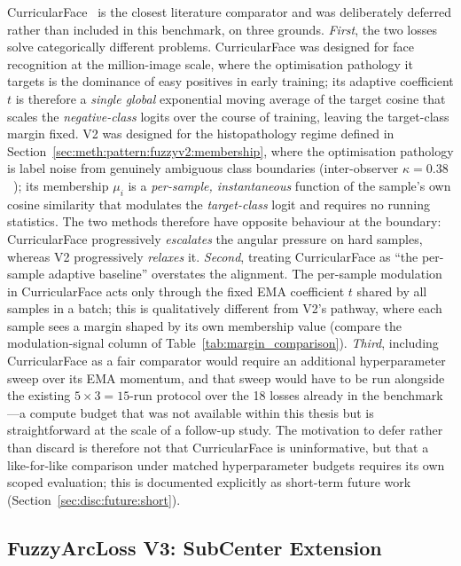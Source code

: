 CurricularFace~\cite{huang2020curricularface} is the closest
literature comparator and was deliberately deferred rather than
included in this benchmark, on three grounds.
\emph{First}, the two losses solve categorically different
problems.
CurricularFace was designed for face recognition at the
million-image scale, where the optimisation pathology it targets
is the dominance of easy positives in early training; its
adaptive coefficient $t$ is therefore a \emph{single global}
exponential moving average of the target cosine that scales the
\emph{negative-class} logits over the course of training, leaving
the target-class margin fixed.
V2 was designed for the histopathology regime defined in
Section~\ref{sec:meth:pattern:fuzzyv2:membership}, where the
optimisation pathology is label noise from genuinely ambiguous
class boundaries (inter-observer
$\kappa = 0.38$~\cite{thunnissen2012reproducibility}); its
membership $\mu_i$ is a \emph{per-sample, instantaneous} function
of the sample's own cosine similarity that modulates the
\emph{target-class} logit and requires no running statistics.
The two methods therefore have opposite behaviour at the boundary:
CurricularFace progressively \emph{escalates} the angular pressure
on hard samples, whereas V2 progressively \emph{relaxes} it.
\emph{Second}, treating CurricularFace as ``the per-sample
adaptive baseline'' overstates the alignment.
The per-sample modulation in CurricularFace acts only through the
fixed EMA coefficient $t$ shared by all samples in a batch; this
is qualitatively different from V2's pathway, where each sample
sees a margin shaped by its own membership value (compare the
modulation-signal column of Table~\ref{tab:margin_comparison}).
\emph{Third}, including CurricularFace as a fair comparator would
require an additional hyperparameter sweep over its EMA momentum,
and that sweep would have to be run alongside the existing
$5 \times 3 = 15$-run protocol over the 18 losses already in
the benchmark---a compute budget that was not available within
this thesis but is straightforward at the scale of a follow-up
study.
The motivation to defer rather than discard is therefore not that
CurricularFace is uninformative, but that a like-for-like comparison
under matched hyperparameter budgets requires its own scoped
evaluation; this is documented explicitly as short-term future work
(Section~\ref{sec:disc:future:short}).


\subsection{FuzzyArcLoss V3: SubCenter Extension}
\label{sec:meth:pattern:fuzzyv3}

